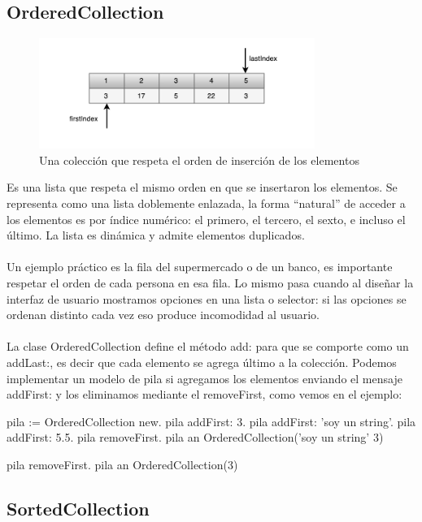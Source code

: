 \documentclass[a4paper,12pt]{book}
\begin{document}
\subsection{OrderedCollection}

\begin{figure}[h!]
    \centering
    \includegraphics[width=0.8\textwidth]{images/40_OrderedCollection.pdf}
    \caption{Una colección que respeta el orden de inserción de los elementos}
\end{figure}
\FloatBarrier

Es una lista que respeta el mismo orden en que se insertaron los elementos. Se representa como una lista
doblemente enlazada, la forma ``natural'' de acceder a los elementos es por índice numérico: el primero, 
el tercero, el sexto, e incluso el último. La lista es dinámica y admite elementos duplicados. 
\\
\\
Un ejemplo práctico es la fila del supermercado o de un banco, es importante respetar el orden de cada
persona en esa fila. Lo mismo pasa cuando al diseñar la interfaz de usuario mostramos opciones en una
lista o selector: si las opciones se ordenan distinto cada vez eso produce incomodidad al usuario.
\\
\\
La clase OrderedCollection define el método add: para que se comporte como un addLast:, es decir que cada
elemento se agrega último a la colección. Podemos implementar un modelo de pila si agregamos los elementos
enviando el mensaje addFirst: y los eliminamos mediante el removeFirst, como vemos en el ejemplo:

\begin{code}
pila := OrderedCollection new.
pila addFirst: 3.
pila addFirst: 'soy un string'.
pila addFirst: 5.5.
pila removeFirst.
pila
  an OrderedCollection('soy un string' 3)

pila removeFirst.
pila
  an OrderedCollection(3)
\end{code}

\subsection{SortedCollection}
\end{document}
